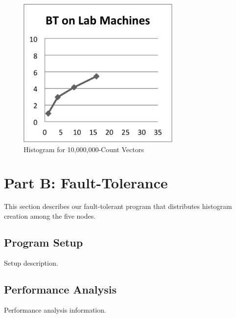 \documentclass{acm_proc_article-sp}
\begin{document}
\begin{figure}[tbp]
  \centering
  \caption{Histogram for 10,000,000-Count Vectors}
	\label{hist10000000}
  \includegraphics[width=19pc]{Pics/BT.png}
\end{figure}

\section{Part B: Fault-Tolerance}
This section describes our fault-tolerant program that distributes histogram creation among the five nodes.

\subsection{Program Setup}
Setup description.

\subsection{Performance Analysis}
Performance analysis information.



%

\end{document}
